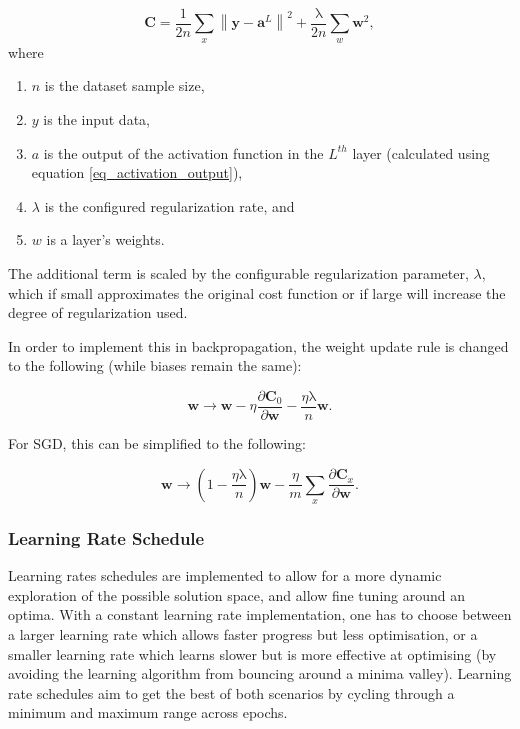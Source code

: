 \documentclass[a4paper,11pt,oneside]{article}
\theoremstyle{plain}
\theoremstyle{definition}
\begin{document}
	\begin{equation}\label{func_l2reg}
	\mathbf{C}=\frac{1}{2 n} \sum_{x}\left\|\mathbf{y}-\mathbf{a}^{L}\right\|^{2}+\frac{\mathrm{\lambda}}{2 n} \sum_{w} \mathbf{w}^{2},
	\end{equation}
	where
	\begin{enumerate}
		\item $n$ is the dataset sample size,
		\item $y$ is the input data,
		\item $a$ is the output of the activation function in the $L^{th}$ layer (calculated using equation \eqref{eq_activation_output}),
		\item $\lambda$ is the configured regularization rate, and
		\item $w$ is a layer's weights.
	\end{enumerate}
	
	The additional term is scaled by the configurable regularization parameter, $\lambda$, which if small approximates the original cost function or if large will increase the degree of regularization used. \newline
	
	In order to implement this in backpropagation, the weight update rule is changed to the following (while biases remain the same):
	
	\begin{equation}\label{func_l2_weight_update}
	\mathbf{w} \rightarrow \mathbf{w}-\eta \frac{\partial \mathbf{C}_{0}}{\partial \mathbf{w}}-\frac{\eta \mathrm{\lambda}}{n} \mathbf{w} .
	\end{equation}
	
	For SGD, this can be simplified to the following: 
	
	\begin{equation}\label{func_sgd_l2}
	\mathbf{w} \rightarrow\left(1-\frac{\eta \mathrm{\lambda}}{n}\right) \mathbf{w}-\frac{\eta}{m} \sum_{x} \frac{\partial \mathbf{C}_{x}}{\partial \mathbf{w}} .
	\end{equation}
	
	
	\subsubsection{Learning Rate Schedule}\label{imp_learning_rate_schedule}
	
	Learning rates schedules are implemented to allow for a more dynamic exploration of the possible solution space, and allow fine tuning around an optima. With a constant learning rate implementation, one has to choose between a larger learning rate which allows faster progress but less optimisation, or a smaller learning rate which learns slower but is more effective at optimising (by avoiding the learning algorithm from bouncing around a minima valley). Learning rate schedules aim to get the best of both scenarios by cycling through a minimum and maximum range across epochs.\newline
	
\end{document}
